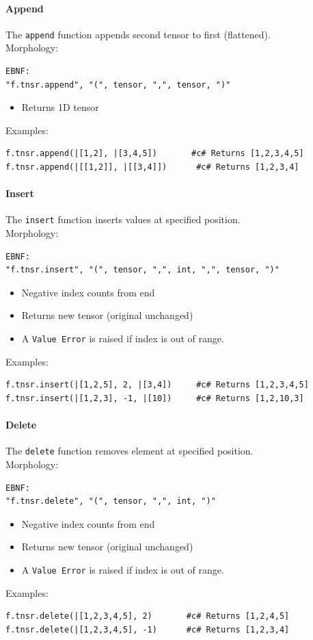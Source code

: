 \paragraph{Append}
The \texttt{append} function appends second tensor to first (flattened).\\
Morphology:
\begin{verbatim}
EBNF:
"f.tnsr.append", "(", tensor, ",", tensor, ")"
\end{verbatim}
\begin{itemize}
\item Returns 1D tensor
\end{itemize}
Examples:
\begin{verbatim}
f.tnsr.append(|[1,2], |[3,4,5])       #c# Returns [1,2,3,4,5]
f.tnsr.append(|[[1,2]], |[[3,4]])      #c# Returns [1,2,3,4]
\end{verbatim}

\paragraph{Insert}
The \texttt{insert} function inserts values at specified position.\\
Morphology:
\begin{verbatim}
EBNF:
"f.tnsr.insert", "(", tensor, ",", int, ",", tensor, ")"
\end{verbatim}
\begin{itemize}
\item Negative index counts from end
\item Returns new tensor (original unchanged)
\item A \texttt{Value Error} is raised if index is out of range.
\end{itemize}
Examples:
\begin{verbatim}
f.tnsr.insert(|[1,2,5], 2, |[3,4])     #c# Returns [1,2,3,4,5]
f.tnsr.insert(|[1,2,3], -1, |[10])     #c# Returns [1,2,10,3]
\end{verbatim}

\paragraph{Delete}
The \texttt{delete} function removes element at specified position.\\
Morphology:
\begin{verbatim}
EBNF:
"f.tnsr.delete", "(", tensor, ",", int, ")"
\end{verbatim}
\begin{itemize}
\item Negative index counts from end
\item Returns new tensor (original unchanged)
\item A \texttt{Value Error} is raised if index is out of range.
\end{itemize}
Examples:
\begin{verbatim}
f.tnsr.delete(|[1,2,3,4,5], 2)       #c# Returns [1,2,4,5]
f.tnsr.delete(|[1,2,3,4,5], -1)      #c# Returns [1,2,3,4]
\end{verbatim}

